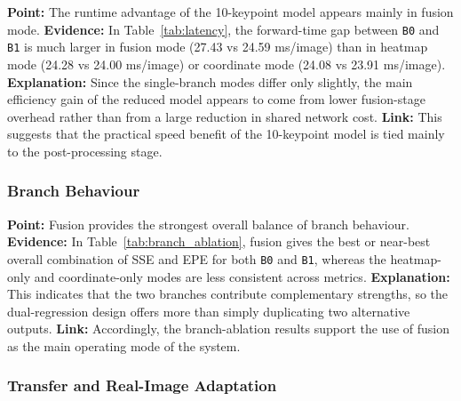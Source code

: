 \documentclass[10pt,letterpaper]{article}
\begin{document}
\medskip
\noindent\textbf{Point:} The runtime advantage of the 10-keypoint model appears mainly in fusion mode.  
\textbf{Evidence:} In Table~\ref{tab:latency}, the forward-time gap between \texttt{B0} and \texttt{B1} is much larger in fusion mode (27.43 vs 24.59 ms/image) than in heatmap mode (24.28 vs 24.00 ms/image) or coordinate mode (24.08 vs 23.91 ms/image).  
\textbf{Explanation:} Since the single-branch modes differ only slightly, the main efficiency gain of the reduced model appears to come from lower fusion-stage overhead rather than from a large reduction in shared network cost.  
\textbf{Link:} This suggests that the practical speed benefit of the 10-keypoint model is tied mainly to the post-processing stage.

\subsubsection{Branch Behaviour}

\medskip
\noindent\textbf{Point:} Fusion provides the strongest overall balance of branch behaviour.  
\textbf{Evidence:} In Table~\ref{tab:branch_ablation}, fusion gives the best or near-best overall combination of SSE and EPE for both \texttt{B0} and \texttt{B1}, whereas the heatmap-only and coordinate-only modes are less consistent across metrics.  
\textbf{Explanation:} This indicates that the two branches contribute complementary strengths, so the dual-regression design offers more than simply duplicating two alternative outputs.  
\textbf{Link:} Accordingly, the branch-ablation results support the use of fusion as the main operating mode of the system.

\subsubsection{Transfer and Real-Image Adaptation}
\end{document}

